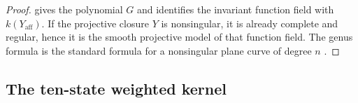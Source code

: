 \begin{proof}

 gives the polynomial \(G\) and
identifies the invariant function field with \(k(Y_{\mathrm{aff}})\).
If the projective closure \(Y\) is nonsingular, it is already complete
and regular, hence it is the smooth projective model of that function
field. The genus formula is the standard formula for a nonsingular
plane curve of degree \(n\)
\cite[Ch.~IV, Example~1.3.4]{Hartshorne1977}.

\end{proof}


\subsection{The ten-state weighted kernel}

